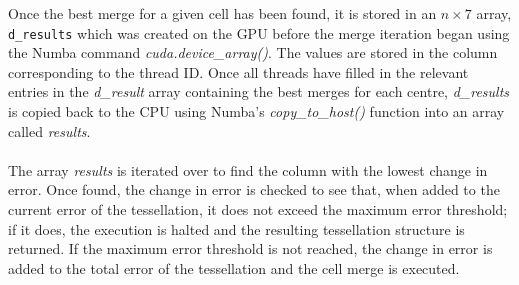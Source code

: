 Once the best merge for a given cell has been found, it is stored in an $n \times 7$ array, \texttt{d\_results} which was created on the GPU before the merge iteration began using the Numba command \textit{cuda.device\_array()}. The values are stored in the column corresponding to the thread ID. Once all threads have filled in the relevant entries in the \textit{d\_result} array containing the best merges for each centre, \textit{d\_results} is copied back to the CPU using Numba's \textit{copy\_to\_host()} function into an array called \textit{results}.
\\
\\
The array \textit{results} is iterated over to find the column with the lowest change in error. Once found, the change in error is checked to see that, when added to the current error of the tessellation, it does not exceed the maximum error threshold; if it does, the execution is halted and the resulting tessellation structure is returned. If the maximum error threshold is not reached, the change in error is added to the total error of the tessellation and the cell merge is executed.